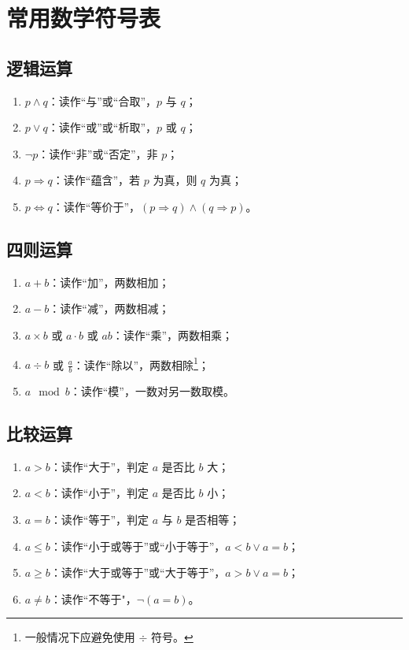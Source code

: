 \chapter{常用数学符号表}

\section{逻辑运算}

\begin{enumerate}
\item $p \land q$：读作“与”或“合取”，$p$ 与 $q$；
\item $p \vee q$：读作“或”或“析取”，$p$ 或 $q$；
\item $ \neg p$：读作“非”或“否定”，非 $p$；
\item $p \Longrightarrow q$：读作“蕴含”，若 $p$ 为真，则 $q$ 为真；
\item $p \Longleftrightarrow q$：读作“等价于”，$(p \Longrightarrow q) \land (q \Longrightarrow p)$。
\end{enumerate}

\section{四则运算}

\begin{enumerate}
\item $a + b$：读作“加”，两数相加；
\item $a - b$：读作“减”，两数相减；
\item $a \times b$ 或 $a \cdot b$ 或 $ab$：读作“乘”，两数相乘；
\item $a \div b$ 或 $\frac{a}{b}$：读作“除以”，两数相除\footnote{\quad 一般情况下应避免使用 $\div$ 符号。}；
\item $a \mod b$：读作“模”，一数对另一数取模。
\end{enumerate}

\section{比较运算}

\begin{enumerate}
\item $a > b$：读作“大于”，判定 $a$ 是否比 $b$ 大；
\item $a < b$：读作“小于”，判定 $a$ 是否比 $b$ 小；
\item $a = b$：读作“等于”，判定 $a$ 与 $b$ 是否相等；
\item $a \leq b$：读作“小于或等于”或“小于等于”，$a < b \vee a = b$；
\item $a \geq b$：读作“大于或等于”或“大于等于”，$a > b \vee a = b$；
\item $a \neq b$：读作“不等于"，$\neg (a = b)$。
\end{enumerate}

